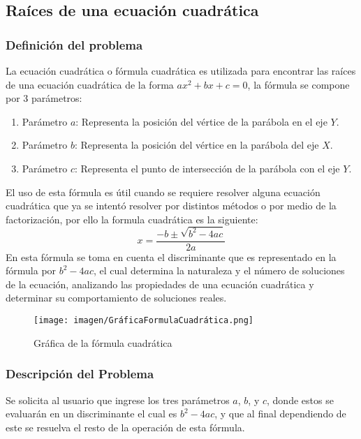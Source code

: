 \subsection{Raíces de una ecuación cuadrática}

\subsubsection{Definición del problema}
La ecuación cuadrática o fórmula cuadrática es utilizada para encontrar las raíces de una ecuación cuadrática de la forma $ax^{2}+bx+c = 0$, la fórmula se compone por 3 parámetros:
\begin{enumerate}
    \item Parámetro ${a}$: Representa la posición del vértice de la parábola en el eje ${Y}$.
    \item Parámetro ${b}$: Representa la posición del vértice en la parábola del eje ${X}$.
    \item Parámetro ${c}$: Representa el punto de intersección de la parábola con el eje ${Y}$.
\end{enumerate}
El uso de esta fórmula es útil cuando se requiere resolver alguna ecuación cuadrática que ya se intentó resolver por distintos métodos o por medio de la factorización, por ello la formula cuadrática es la siguiente:
\begin{equation}
    x = \frac{-b\pm\sqrt{b^2-4ac}}{2a}
\end{equation}
En esta fórmula se toma en cuenta el discriminante que es representado en la fórmula por $b^2-4ac$, el cual determina la naturaleza y el número de soluciones de la ecuación, analizando las propiedades de una ecuación cuadrática y determinar su comportamiento de soluciones reales.\cite{FormulaCuadratica}\\

\begin{figure}[H]
    \centerline{\texttt{[image: imagen/GráficaFormulaCuadrática.png]}}
    \caption{Gráfica de la fórmula cuadrática}
    \label{fig}
\end{figure}

\subsubsection{Descripción del Problema}
Se solicita al usuario que ingrese los tres parámetros $a$, $b$, y $c$, donde estos se evaluarán en un discriminante el cual es $b^2-4ac$, y que al final dependiendo de este se resuelva el resto de la operación de esta fórmula.

